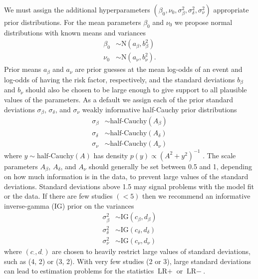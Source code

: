 \documentclass[AMA,STIX1COL]{WileyNJD-v2}
\begin{document}
We must assign the additional hyperparameters $(\beta_0, \nu_0, \sigma^2_{\beta}, \sigma^2_{\delta}, \sigma^2_{\nu})$ appropriate prior distributions. For the mean parameters $\beta_0$ and $\nu_0$ we propose normal distributions with known means and variances
\begin{align}
\beta_0 &\sim \mbox{N}(a_\beta, b_\beta^2) \label{eq:beta0} \\
\nu_0 &\sim \mbox{N}(a_\nu, b_\nu^2). \label{eq:nu0}
\end{align}
\noindent Prior means $a_\beta$ and $a_\nu$ are prior guesses at the mean log-odds of an event and log-odds of having the risk factor, respectively, and the standard deviations $b_\beta$ and $b_\nu$ should also be chosen to be large enough to give support to all plausible values of the parameters. As a default we assign each of the prior standard deviations $\sigma_\beta$, $\sigma_\delta$, and $\sigma_\nu$ weakly informative half-Cauchy prior distributions
\begin{align}
\sigma_\beta &\sim \mbox{half-Cauchy}(A_\beta) \label{eq:sigmabeta} \\
\sigma_\delta &\sim \mbox{half-Cauchy}(A_\delta) \label{eq:sigmadelta} \\
\sigma_\nu &\sim \mbox{half-Cauchy}(A_\nu) \label{eq:sigmanu}
\end{align}
where $y \sim \mbox{half-Cauchy}(A)$ has density $p(y) \propto (A^2 + y^2)^{-1}$ \citet{gelman2006prior}. The scale parameters $A_\beta$, $A_\delta$, and $A_\nu$ should generally be set between 0.5 and 1, depending on how much information is in the data, to prevent large values of the standard deviations. Standard deviations above 1.5 may signal problems with the model fit or the data. If there are few studies $(< 5)$ then we recommend an informative inverse-gamma (IG) prior on the variances
\begin{align}
\sigma_\beta^2 &\sim \mbox{IG}(c_\beta, d_\beta)  \nonumber \\
\sigma_\delta^2 &\sim \mbox{IG}(c_\delta, d_\delta)  \nonumber \\
\sigma_\nu^2 &\sim \mbox{IG}(c_\nu, d_\nu) \nonumber
\end{align}
\noindent where $(c_\cdot, d_\cdot)$ are chosen to heavily restrict large values of standard deviations, such as (4, 2) or (3, 2). With very few studies (2 or 3), large standard deviations can lead to estimation problems for the statistics $\mbox{LR}+$ or $\mbox{LR}-$.


\end{document}
